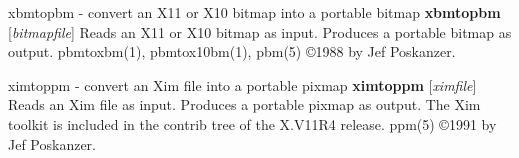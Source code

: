 %

\newpage
%

xbmtopbm - convert an X11 or X10 bitmap into a portable bitmap
{\bf xbmtopbm}
{\rm [}{\it bitmapfile}{\rm ]}
Reads an X11 or X10 bitmap as input.
Produces a portable bitmap as output.
pbmtoxbm(1), pbmtox10bm(1), pbm(5)
\copyright 1988 by Jef Poskanzer.
%
 
%

\newpage
%

ximtoppm - convert an Xim file into a portable pixmap
{\bf ximtoppm}
{\rm [}{\it ximfile}{\rm ]}
Reads an Xim file as input.
Produces a portable pixmap as output.
The Xim toolkit is included in the contrib tree of the X.V11R4 release.
ppm(5)
\copyright 1991 by Jef Poskanzer.
%
 
